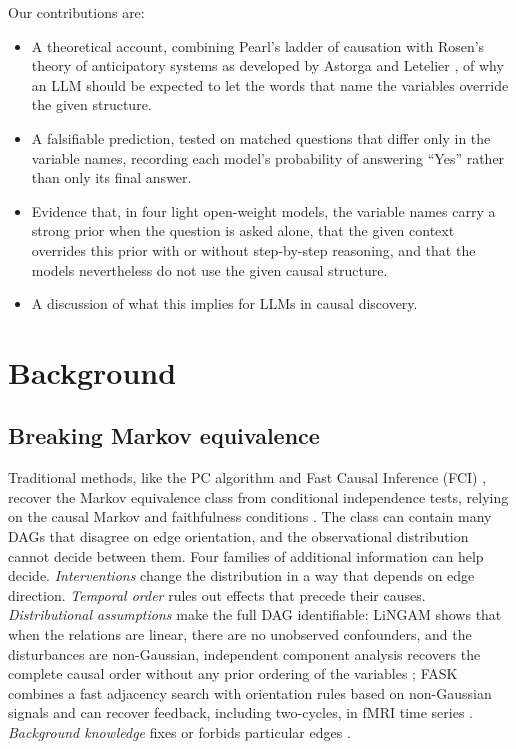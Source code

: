 \documentclass{llncs}
\begin{document}
Our contributions are:
\begin{itemize}
    \item A theoretical account, combining Pearl's ladder of causation \cite{pearl2009causality,pearl2018theoretical} with Rosen's theory of anticipatory systems \cite{rosen2012anticipatory} as developed by Astorga and Letelier \cite{astorga2026anticipation}, of why an LLM should be expected to let the words that name the variables override the given structure.
    \item A falsifiable prediction, tested on matched questions that differ only in the variable names, recording each model's probability of answering ``Yes'' rather than only its final answer.
    \item Evidence that, in four light open-weight models, the variable names carry a strong prior when the question is asked alone, that the given context overrides this prior with or without step-by-step reasoning, and that the models nevertheless do not use the given causal structure.
    \item A discussion of what this implies for LLMs in causal discovery.
\end{itemize}

\section{Background}
\label{sec:background}

\subsection{Breaking Markov equivalence}
\label{sec:mec}

Traditional methods, like the PC algorithm and Fast Causal Inference (FCI) \cite{spirtes2000causation}, recover the Markov equivalence class from conditional independence tests, relying on the causal Markov and faithfulness conditions \cite{glymour2019review}. The class can contain many DAGs that disagree on edge orientation, and the observational distribution cannot decide between them. Four families of additional information can help decide. \emph{Interventions} change the distribution in a way that depends on edge direction. \emph{Temporal order} rules out effects that precede their causes. \emph{Distributional assumptions} make the full DAG identifiable: LiNGAM shows that when the relations are linear, there are no unobserved confounders, and the disturbances are non-Gaussian, independent component analysis recovers the complete causal order without any prior ordering of the variables \cite{shimizu2006linear}; FASK combines a fast adjacency search with orientation rules based on non-Gaussian signals and can recover feedback, including two-cycles, in fMRI time series \cite{sanchez2019estimating}. \emph{Background knowledge} fixes or forbids particular edges \cite{spirtes2016causal,peters2017elements}.
\end{document}
